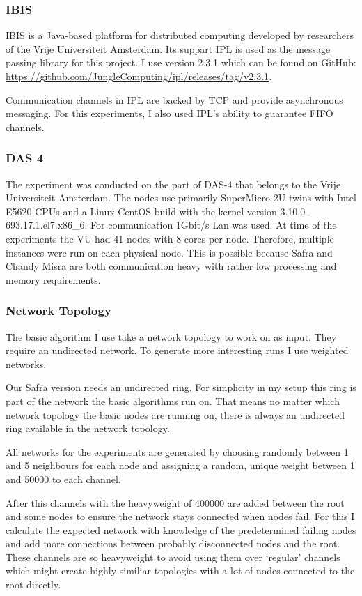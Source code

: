 \subsubsection{IBIS}
  IBIS is a Java-based platform for distributed computing developed by researchers of the Vrije Universiteit Amsterdam. 
  Its suppart IPL is used as the message passing library for this project. 
  I use version 2.3.1 which can be found on GitHub: \href{https://github.com/JungleComputing/ipl/releases/tag/v2.3.1}{https://github.com/JungleComputing/ipl/releases/tag/v2.3.1}.
  
  Communication channels in IPL are backed by TCP and provide asynchronous messaging.
  For this experiments, I also used IPL's ability to guarantee FIFO channels.
\subsubsection{DAS 4}
  The experiment was conducted on the part of DAS-4 that belongs to the Vrije Universiteit Amsterdam. 
  The nodes use primarily SuperMicro 2U-twins with Intel E5620 CPUs and a Linux CentOS build with the kernel version 3.10.0-693.17.1.el7.x86\_6.
  For communication 1Gbit/s Lan was used.
  At time of the experiments the VU had 41 nodes with 8 cores per node.
  Therefore, multiple instances were run on each physical node.
  This is possible because Safra and Chandy Misra are both communication heavy with rather low processing and memory requirements.
 
\subsubsection{Network Topology}
  The basic algorithm I use take a network topology to work on as input. 
  They require an undirected network.
  To generate more interesting runs I use weighted networks.
  
  Our Safra version needs an undirected ring. 
  For simplicity in my setup this ring is part of the network the basic algorithms run on. 
  That means no matter which network topology the basic nodes are running on, there is always an undirected ring available in the network topology.
  
  All networks for the experiments are generated by choosing randomly between 1 and 5 neighbours for each node and assigning a random, unique weight between 1 and 50000 to each channel.
  
  After this channels with the heavyweight of 400000 are added between the root and some nodes to ensure the network stays connected when nodes fail.
  For this I calculate the expected network with knowledge of the predetermined failing nodes and add more connections between probably disconnected nodes and the root.
  These channels are so heavyweight to avoid using them over `regular' channels which might create highly similiar topologies with a lot of nodes connected to the root directly.
  
